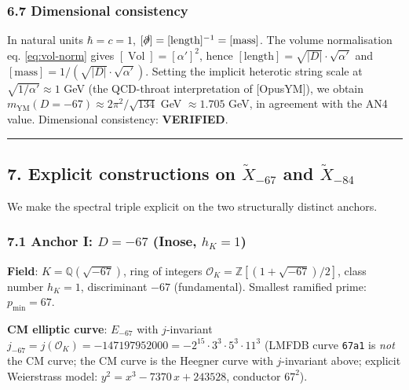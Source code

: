 \documentclass[
  11pt,
  a4paper,
]{amsart}
\begin{document}
\hypertarget{dimensional-consistency}{%
\subsubsection{6.7 Dimensional consistency}\label{dimensional-consistency}}

In natural units \(\hbar = c = 1\), \([\slashed{\partial}] = [\text{length}]^{-1} = [\text{mass}]\).
The volume normalisation eq. \eqref{eq:vol-norm} gives
\([\operatorname{Vol}] = [\alpha']^2\), hence \([\text{length}] = \sqrt{|D|} \cdot \sqrt{\alpha'}\)
and \([\text{mass}] = 1/(\sqrt{|D|} \cdot \sqrt{\alpha'})\). Setting the implicit
heterotic string scale at \(\sqrt{1/\alpha'} \approx 1\) GeV (the QCD-throat
interpretation of {[}OpusYM{]}), we obtain
\(m_{\mathrm{YM}}(D = -67) \approx 2\pi^2/\sqrt{134}\) GeV \(\approx 1.705\) GeV, in
agreement with the AN4 value. Dimensional consistency: \textbf{VERIFIED}.

\begin{center}\rule{0.5\linewidth}{0.5pt}\end{center}

\hypertarget{explicit-constructions-on-widetildex_-67-and-widetildex_-84}{%
\subsection{\texorpdfstring{7. Explicit constructions on \(\widetilde{X}_{-67}\) and \(\widetilde{X}_{-84}\)}{7. Explicit constructions on \textbackslash widetilde\{X\}\_\{-67\} and \textbackslash widetilde\{X\}\_\{-84\}}}\label{explicit-constructions-on-widetildex_-67-and-widetildex_-84}}

We make the spectral triple explicit on the two structurally distinct anchors.

\hypertarget{anchor-i-d--67-inose-h_k-1}{%
\subsubsection{\texorpdfstring{7.1 Anchor I: \(D = -67\) (Inose, \(h_K = 1\))}{7.1 Anchor I: D = -67 (Inose, h\_K = 1)}}\label{anchor-i-d--67-inose-h_k-1}}

\textbf{Field}: \(K = \mathbb{Q}(\sqrt{-67})\), ring of integers
\(\mathcal{O}_K = \mathbb{Z}[(1+\sqrt{-67})/2]\), class number \(h_K = 1\),
discriminant \(-67\) (fundamental). Smallest ramified prime: \(p_{\min} = 67\).

\textbf{CM elliptic curve}: \(E_{-67}\) with \(j\)-invariant
\(j_{-67} = j(\mathcal{O}_K) = -147197952000 = -2^{15}\cdot 3^3 \cdot 5^3 \cdot 11^3\)
(LMFDB curve \texttt{67a1} is \emph{not} the CM curve; the CM curve is the Heegner curve
with \(j\)-invariant above; explicit Weierstrass model:
\(y^2 = x^3 - 7370\, x + 243528\), conductor \(67^2\)).
\end{document}
